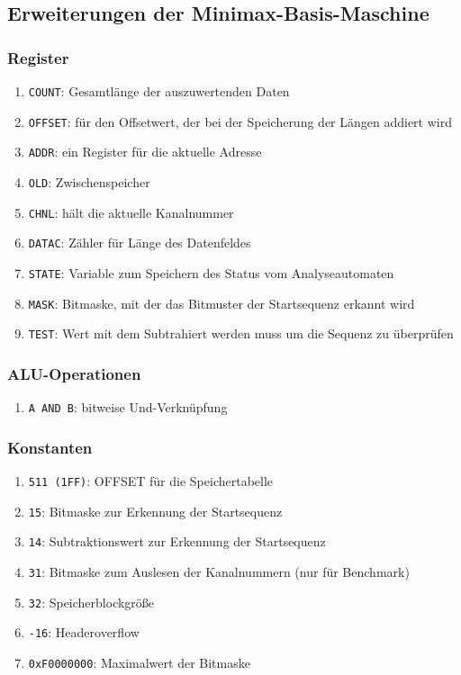 \documentclass[12pt,titlepage]{article}
\begin{document}
\subsection{Erweiterungen der Minimax-Basis-Maschine}

\subsubsection{Register}

\begin{enumerate}
\item \texttt{COUNT}: Gesamtl{\"a}nge der auszuwertenden Daten
\item \texttt{OFFSET}: f{\"u}r den Offsetwert, der bei der Speicherung der Längen addiert wird
\item \texttt{ADDR}: ein Register f{\"u}r die aktuelle Adresse
\item \texttt{OLD}: Zwischenspeicher
\item \texttt{CHNL}: hält die aktuelle Kanalnummer
\item \texttt{DATAC}: Zähler für Länge des Datenfeldes
\item \texttt{STATE}: Variable zum Speichern des Status vom Analyseautomaten
\item \texttt{MASK}: Bitmaske, mit der das Bitmuster der Startsequenz erkannt wird
\item \texttt{TEST}: Wert mit dem Subtrahiert werden muss um die Sequenz zu überprüfen
\end{enumerate}

\subsubsection{ALU-Operationen}

\begin{enumerate}
\item \texttt{A AND B}: bitweise Und-Verknüpfung
\end{enumerate}

\subsubsection{Konstanten}
\begin{enumerate}
\item \texttt{511 (1FF)}: OFFSET für die Speichertabelle
\item \texttt{15}: Bitmaske zur Erkennung der Startsequenz
\item \texttt{14}: Subtraktionswert zur Erkennung der Startsequenz
\item \texttt{31}: Bitmaske zum Auslesen der Kanalnummern (nur für Benchmark)
\item \texttt{32}: Speicherblockgröße
\item \texttt{-16}: Headeroverflow
\item \texttt{0xF0000000}: Maximalwert der Bitmaske
\end{enumerate}
\end{document}
